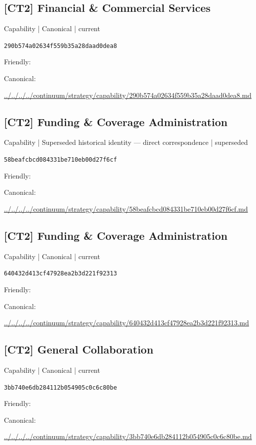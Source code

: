 \documentclass[10pt,a4paper]{article}
\begin{document}
\subsection*{[CT2] Financial \& Commercial Services}
{\small Capability | Canonical | current}\par
\texttt{290b574a02634f559b35a28daad0dea8}\par
Friendly: \par
Canonical: \par
{\footnotesize\url{../../../../continuum/strategy/capability/290b574a02634f559b35a28daad0dea8.md}}\par
\subsection*{[CT2] Funding \& Coverage Administration}
{\small Capability | Superseded historical identity — direct correspondence | superseded}\par
\texttt{58beafcbcd084331be710eb00d27f6cf}\par
Friendly: \par
Canonical: \par
{\footnotesize\url{../../../../continuum/strategy/capability/58beafcbcd084331be710eb00d27f6cf.md}}\par
\subsection*{[CT2] Funding \& Coverage Administration}
{\small Capability | Canonical | current}\par
\texttt{640432d413cf47928ea2b3d221f92313}\par
Friendly: \par
Canonical: \par
{\footnotesize\url{../../../../continuum/strategy/capability/640432d413cf47928ea2b3d221f92313.md}}\par
\subsection*{[CT2] General Collaboration}
{\small Capability | Canonical | current}\par
\texttt{3bb740e6db284112b054905c0c6c80be}\par
Friendly: \par
Canonical: \par
{\footnotesize\url{../../../../continuum/strategy/capability/3bb740e6db284112b054905c0c6c80be.md}}\par
\end{document}
